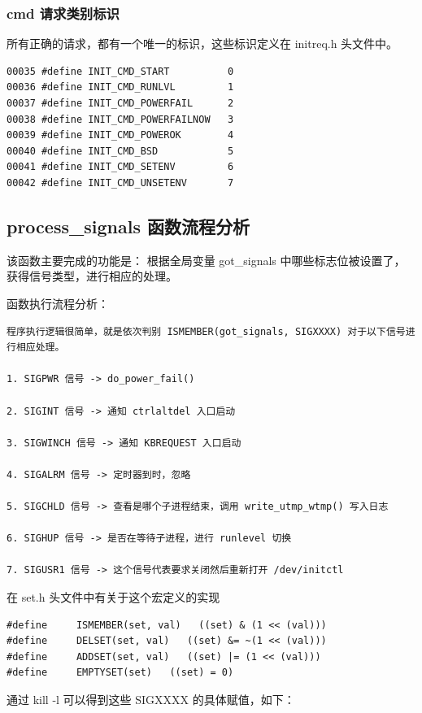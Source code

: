 \subsubsection{cmd 请求类别标识}

所有正确的请求，都有一个唯一的标识，这些标识定义在 initreq.h 头文件中。

{\begin{shaded}\begin{verbatim}
00035 #define INIT_CMD_START          0
00036 #define INIT_CMD_RUNLVL         1
00037 #define INIT_CMD_POWERFAIL      2
00038 #define INIT_CMD_POWERFAILNOW   3
00039 #define INIT_CMD_POWEROK        4
00040 #define INIT_CMD_BSD            5
00041 #define INIT_CMD_SETENV         6
00042 #define INIT_CMD_UNSETENV       7
\end{verbatim}\end{shaded}}
\subsection{process\_signals 函数流程分析}

该函数主要完成的功能是： 根据全局变量 got\_signals
中哪些标志位被设置了，获得信号类型，进行相应的处理。

函数执行流程分析：

{\begin{shaded}\begin{verbatim}
程序执行逻辑很简单，就是依次判别 ISMEMBER(got_signals, SIGXXXX) 对于以下信号进行相应处理。

1. SIGPWR 信号 -> do_power_fail()

2. SIGINT 信号 -> 通知 ctrlaltdel 入口启动

3. SIGWINCH 信号 -> 通知 KBREQUEST 入口启动

4. SIGALRM 信号 -> 定时器到时，忽略

5. SIGCHLD 信号 -> 查看是哪个子进程结束，调用 write_utmp_wtmp() 写入日志

6. SIGHUP 信号 -> 是否在等待子进程，进行 runlevel 切换

7. SIGUSR1 信号 -> 这个信号代表要求关闭然后重新打开 /dev/initctl
\end{verbatim}\end{shaded}}
在 set.h 头文件中有关于这个宏定义的实现

{\begin{shaded}\begin{verbatim}
#define     ISMEMBER(set, val)   ((set) & (1 << (val)))
#define     DELSET(set, val)   ((set) &= ~(1 << (val)))
#define     ADDSET(set, val)   ((set) |= (1 << (val)))
#define     EMPTYSET(set)   ((set) = 0)
\end{verbatim}\end{shaded}}
通过 kill -l 可以得到这些 SIGXXXX 的具体赋值，如下：

